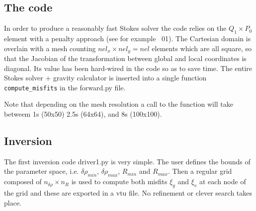 \subsection*{The code}

In order to produce a reasonably fast Stokes solver the code relies on 
the $Q_1\times P_0$ element with a penalty approach (see for example \stone~01).
The Cartesian domain is overlain with a mesh counting $nel_x\times nel_y=nel$
elements which are all square, so that the Jacobian of the transformation
between global and local coordinates is diagonal. Its value has been 
hard-wired in the code so as to save time. 
The entire Stokes solver + gravity calculator is inserted into a single function
{\tt compute\_misfits} in the {\pythonfile forward.py} file.

Note that depending on the mesh resolution a call to the function will take betweem 1s 
(50x50) 2.5s (64x64), and 8s (100x100). 

\subsection*{Inversion}

The first inversion code {\pythonfile driver1.py} is very simple. The user defines the bounds of the 
parameter space, i.e. $\delta\rho_{min}$, $\delta\rho_{max}$, $R_{min}$ and $R_{max}$.
Then a regular grid composed of $n_{\delta\rho} \times n_{R}$ is used to compute 
both misfits $\xi_g$ and $\xi_v$ at each node of the grid and these are 
exported in a vtu file. No refinement or clever search takes place. 


